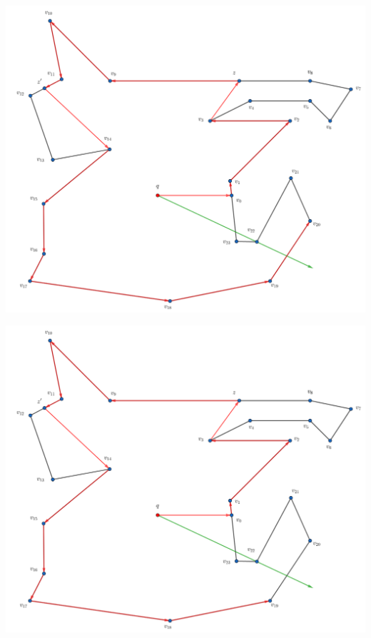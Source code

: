 \begin{frame}
  \centering \includegraphics[width=0.70 \paperwidth]{images/Ejecucion/e28.png}
\end{frame}

\begin{frame}
  \centering \includegraphics[width=0.70 \paperwidth]{images/Ejecucion/e29.png}
\end{frame}

